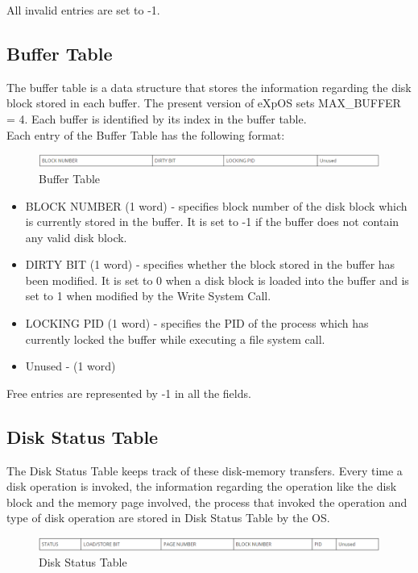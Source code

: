 All invalid entries are set to -1.

\subsection {Buffer Table}

The buffer table is a data structure that stores the information regarding the disk block stored in each buffer. The present version of eXpOS sets MAX\_BUFFER = 4. Each buffer is identified by its index in the buffer table.
\\
Each entry of the Buffer Table has the following format:
\begin{figure}[ht]
\centering
\includegraphics  [scale=0.55]{figures/bt.png}
\caption{\footnotesize Buffer Table}
\end{figure}
\begin {itemize}
\item BLOCK NUMBER (1 word) - specifies block number of the disk block which is currently stored in the buffer. It is set to -1 if the buffer does not contain any valid disk block.
\item DIRTY BIT (1 word) - specifies whether the block stored in the buffer has been modified. It is set to 0 when a disk block is loaded into the buffer and is set to 1 when modified by the Write System Call.
\item LOCKING PID (1 word) - specifies the PID of the process which has currently locked the buffer while executing a file system call.
\item Unused - (1 word)
\end {itemize}

Free entries are represented by -1 in all the fields.

\subsection {Disk Status Table}

The Disk Status Table keeps track of these disk-memory transfers. Every time a disk operation is invoked, the information regarding the operation like the disk block and the memory page involved, the process that invoked the operation and type of disk operation are stored in Disk Status Table by the OS.
\\
\begin{figure}[ht]
\centering
\includegraphics  [scale=0.55]{figures/ds.png}
\caption{\footnotesize Disk Status Table}
\end{figure}

